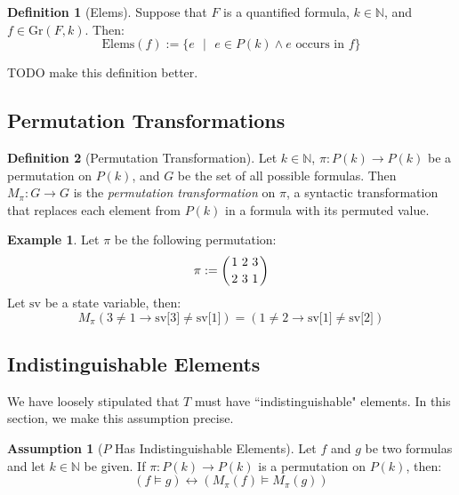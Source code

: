 \documentclass[12pt]{article}
\theoremstyle{definition}
\newtheorem{assumption}{Assumption}
\newtheorem{definition}{Definition}
\newtheorem{example}{Example}
\theoremstyle{remark}
\newcommand{\msp}{\text{ }}
\newcommand{\st}{\text{ }|\text{ }}
\newcommand{\states}{\text{States}}
\newcommand{\gr}{\text{Gr}}
\newcommand{\elems}{\text{Elems}}
\newcommand{\perm}{\genfrac{}{}{0pt}{}}
\begin{document}
\begin{definition}[Elems]
  Suppose that $F$ is a quantified formula, $k \in \mathbb{N}$, and $f \in \gr(F,k)$.  Then:
  $$\elems(f) := \{e \st e \in P(k) \land e \text{ occurs in } f\}$$

  TODO make this definition better.
\end{definition}

\subsection{Permutation Transformations}

\begin{definition}[Permutation Transformation]
  Let $k \in \mathbb{N}$, $\pi : P(k) \to P(k)$ be a permutation on $P(k)$, and $G$ be the set of all possible formulas.  Then $M_\pi : G \to G$ is the \textit{permutation transformation} on $\pi$, a syntactic transformation that replaces each element from $P(k)$ in a formula with its permuted value.
\end{definition}

\begin{example}
  Let $\pi$ be the following permutation:
  $$\pi := \left( \perm{1 \msp 2 \msp 3}{2 \msp 3 \msp 1} \right)$$
  Let $\text{sv}$ be a state variable, then:
  $$M_\pi(3 \neq 1 \rightarrow \text{sv[3]} \neq \text{sv[1]}) = (1 \neq 2 \rightarrow \text{sv[1]} \neq \text{sv[2]})$$
\end{example}

\subsection{Indistinguishable Elements}
We have loosely stipulated that $T$ must have ``indistinguishable" elements.  In this section, we make this assumption precise.

\begin{assumption}[$P$ Has Indistinguishable Elements]
  \label{asmp:indist}
  Let $f$ and $g$ be two formulas and let $k \in \mathbb{N}$ be given.  If $\pi : P(k) \to P(k)$ is a permutation on $P(k)$, then:
  $$(f \models g) \leftrightarrow (M_\pi(f) \models M_\pi(g))$$
\end{assumption}
\end{document}
